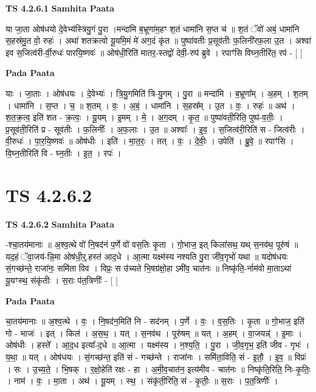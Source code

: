 \documentclass[17pt]{extarticle}
\begin{document}
\textbf{TS 4.2.6.1 } \newline
\textbf{Samhita Paata} \newline

या जा॒ता ओष॑धयो दे॒वेभ्य॑स्त्रियु॒गं पु॒रा ।मन्दा॑मि ब॒भ्रूणा॑म॒हꣳ श॒तं धामा॑नि स॒प्त च॑ ॥ श॒तं ॅवो॑ अबं॒ धामा॑नि स॒हस्र॑मु॒त वो॒ रुहः॑ । अथा॑ शतक्रत्वो यू॒यमि॒मं मे॑ अग॒दं कृ॑त ॥ पुष्पा॑वतीः प्र॒सूव॑तीः फ॒लिनी॑रफ॒ला उ॒त । अश्वा॑ इव स॒जित्व॑री-र्वी॒रुधः॑ पारयि॒ष्णवः॑ ॥ ओष॑धी॒रिति॑ मातर॒-स्तद्वो॑ देवी॒-रुप॑ ब्रुवे । रपाꣳ॑सि विघ्न॒तीरि॑त॒ रप॑ - [  ] \newline

\textbf{Pada Paata} \newline

याः । जा॒ताः । ओष॑धयः । दे॒वेभ्यः॑ । त्रि॒यु॒गमिति॑ त्रि-यु॒गम् । पु॒रा ॥ मन्दा॑मि । ब॒भ्रूणा᳚म् । अ॒हम् । श॒तम् । धामा॑नि । स॒प्त । च॒ ॥ श॒तम् । वः॒ । अ॒बं॒ । धामा॑नि । स॒हस्र᳚म् । उ॒त । वः॒ । रुहः॑ ॥ अथ॑ । श॒त॒क्र॒त्व॒ इति॑ शत - क्र॒त्वः॒ । यू॒यम् । इ॒मम् । मे॒ । अ॒ग॒दम् । कृ॒त॒ ॥ पुष्पा॑वती॒रिति॒ पुष्प॑-व॒तीः॒ । प्र॒सूव॑ती॒रिति॑ प्र - सूव॑तीः । फ॒लिनीः᳚ । अ॒फ॒लाः । उ॒त ॥ अश्वाः᳚ । इ॒व॒ । स॒जित्व॑री॒रिति॑ स - जित्व॑रीः । वी॒रुधः॑ । पा॒र॒यि॒ष्णवः॑ ॥ ओष॑धीः । इति॑ । मा॒त॒रः॒ । तत् । वः॒ । दे॒वीः॒ । उपेति॑ । ब्रु॒वे॒ ॥ रपाꣳ॑सि । वि॒घ्न॒तीरिति॑ वि - घ्न॒तीः । इ॒त॒ । रपः॑ ।  \newline




\section*{ TS 4.2.6.2 }

\textbf{TS 4.2.6.2 } \newline
\textbf{Samhita Paata} \newline

-श्चा॒तय॑मानाः ॥ अ॒श्व॒त्थे वो॑ नि॒षद॑नं प॒र्णे वो॑ वस॒तिः कृ॒ता । गो॒भाज॒ इत् किला॑सथ॒ यथ् स॒नव॑थ॒ पूरु॑षं ॥ यद॒हं ॅवा॒जय॑-न्नि॒मा ओष॑धी॒र्॒.हस्त॑ आद॒धे । आ॒त्मा यक्ष्म॑स्य नश्यति पु॒रा जी॑व॒गृभो॑ यथा ॥ यदोष॑धयः सं॒गच्छ॑न्ते॒ राजा॑नः॒ समि॑ता विव । विप्रः॒ स उ॑च्यते भि॒षग्र॑क्षो॒हा ऽमी॑व॒ चात॑नः ॥ निष्कृ॑ति॒-र्नाम॑वो मा॒ताऽथा॑ यू॒यꣳस्थ॒ संकृ॑तीः । स॒राः प॑त॒त्रिणीः᳚ - [  ] \newline

\textbf{Pada Paata} \newline

चा॒तय॑मानाः ॥ अ॒श्व॒त्थे । वः॒ । नि॒षद॑न॒मिति॑ नि - सद॑नम् । प॒र्णे । वः॒ । व॒स॒तिः । कृ॒ता ॥ गो॒भाज॒ इति॑ गो - भाजः॑ । इत् । किल॑ । अ॒स॒थ॒ । यत् । स॒नव॑थ । पूरु॑षम् ॥ यत् । अ॒हम् । वा॒जयन्न्॑ । इ॒माः । ओष॑धीः । हस्ते᳚ । आ॒द॒ध इत्या᳚-द॒धे ॥ आ॒त्मा । यक्ष्म॑स्य । न॒श्य॒ति॒ । पु॒रा । जी॒व॒गृभ॒ इति॑ जीव - गृभः॑ । य॒था॒ ॥ यत् । ओष॑धयः । सं॒गच्छ॑न्त॒ इति॑ सं - गच्छ॑न्ते । राजा॑नः । समि॑ता॒विति॒ सं - इ॒तौ॒ । इ॒व॒ ॥ विप्रः॑ । सः । उ॒च्य॒ते॒ । भि॒षक् । र॒क्षो॒हेति॑ रक्षः - हा । अ॒मी॒व॒चात॑न॒ इत्य॑मीव - चात॑नः ॥ निष्कृ॑ति॒रिति॒ निः-कृ॒तिः॒ । नाम॑ । वः॒ । मा॒ता । अथ॑ । यू॒यम् । स्थ॒ । संकृ॑ती॒रिति॒ सं - कृ॒तीः॒ ॥ स॒राः । प॒त॒त्रिणीः᳚ ।  \newline
\end{document}
